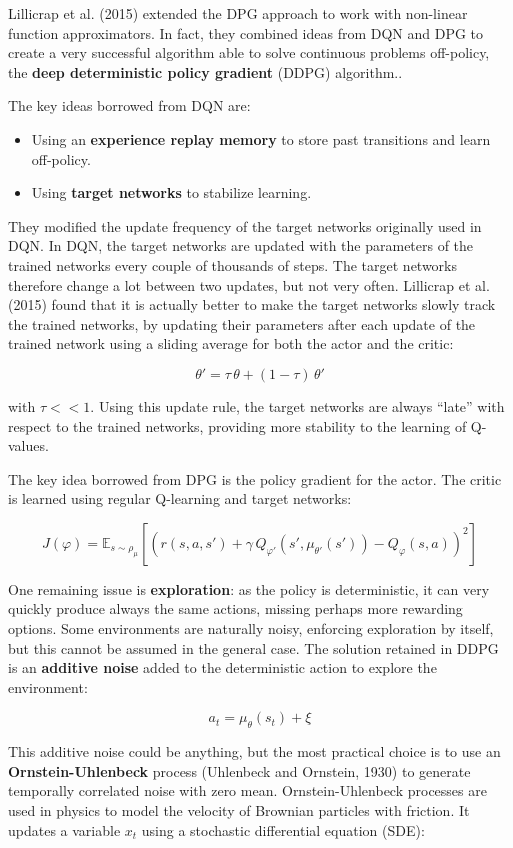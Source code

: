 \documentclass[
  letterpaper,
  DIV=11,
  numbers=noendperiod]{scrreprt}
\providecommand{\tightlist}{%
  \setlength{\itemsep}{0pt}\setlength{\parskip}{0pt}}\usepackage{longtable,booktabs,array}
\begin{document}
Lillicrap et al. (2015) extended the DPG approach to work with
non-linear function approximators. In fact, they combined ideas from DQN
and DPG to create a very successful algorithm able to solve continuous
problems off-policy, the \textbf{deep deterministic policy gradient}
(DDPG) algorithm..

The key ideas borrowed from DQN are:

\begin{itemize}
\tightlist
\item
  Using an \textbf{experience replay memory} to store past transitions
  and learn off-policy.
\item
  Using \textbf{target networks} to stabilize learning.
\end{itemize}

They modified the update frequency of the target networks originally
used in DQN. In DQN, the target networks are updated with the parameters
of the trained networks every couple of thousands of steps. The target
networks therefore change a lot between two updates, but not very often.
Lillicrap et al. (2015) found that it is actually better to make the
target networks slowly track the trained networks, by updating their
parameters after each update of the trained network using a sliding
average for both the actor and the critic:

\[
    \theta' = \tau \, \theta + (1-\tau) \, \theta'
\]

with \(\tau <<1\). Using this update rule, the target networks are
always ``late'' with respect to the trained networks, providing more
stability to the learning of Q-values.

The key idea borrowed from DPG is the policy gradient for the actor. The
critic is learned using regular Q-learning and target networks:

\[
    J(\varphi) = \mathbb{E}_{s \sim \rho_\mu}[(r(s, a, s') + \gamma \, Q_{\varphi'}(s', \mu_{\theta'}(s')) - Q_\varphi(s, a))^2]
\]

One remaining issue is \textbf{exploration}: as the policy is
deterministic, it can very quickly produce always the same actions,
missing perhaps more rewarding options. Some environments are naturally
noisy, enforcing exploration by itself, but this cannot be assumed in
the general case. The solution retained in DDPG is an \textbf{additive
noise} added to the deterministic action to explore the environment:

\[
    a_t = \mu_\theta(s_t) + \xi
\]

This additive noise could be anything, but the most practical choice is
to use an \textbf{Ornstein-Uhlenbeck} process (Uhlenbeck and Ornstein,
1930) to generate temporally correlated noise with zero mean.
Ornstein-Uhlenbeck processes are used in physics to model the velocity
of Brownian particles with friction. It updates a variable \(x_t\) using
a stochastic differential equation (SDE):
\end{document}

